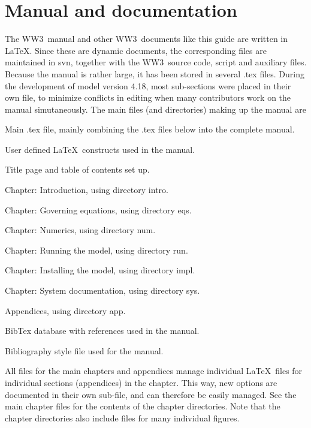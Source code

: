 \documentclass[12pt]{article}
\newcommand{\ws}{WW3}
\newcommand{\file}{\sf}
\newcommand{\pb}{\strut \vfill \pagebreak}
\newcommand{\newsec}{\setcounter{equation}{0}
                      \setcounter{myfigno}{0}
                      \setcounter{mytabno}{0}}
\newenvironment{flist}{\begin{list}{nofile ?}{\parsep 0mm
            \itemsep 0mm \leftmargin 35mm \labelwidth 25mm
            \rightmargin 10mm}}{\end{list}}
\newcommand{\fit}[2]{\item[{\file{#1}}\hfill]{#2}}
\newcounter{myfigno}[section]
\newcounter{mytabno}[section]
\begin{document}
\clearpage

\section{Manual and documentation} \label{sec:man}
\newsec

The \ws\ manual and other \ws\ documents like this guide are written in
\LaTeX. Since these are dynamic documents, the corresponding files are
maintained in svn, together with the \ws\ source code, script and auxiliary
files. Because the manual is rather large, it has been stored in several
{\file .tex} files. During the development of model version 4.18, most
sub-sections were placed in their own file, to minimize conflicts in editing
when many contributors work on the manual simutaneously.  The main files (and
directories) making up the manual are

\begin{flist}
\fit{manual.tex}{Main {\file .tex} file, mainly combining the {\file .tex}
                 files below into the complete manual.}
\fit{defs.tex  }{User defined \LaTeX\ constructs used in the manual.}
\fit{start.tex }{Title page and table of contents set up.}
\fit{intro.tex }{Chapter: Introduction, using directory {\file intro}.}
\fit{eqs.tex   }{Chapter: Governing equations, using directory {\file eqs}.}
\fit{num.tex   }{Chapter: Numerics, using directory {\file num}.}
\fit{run.tex   }{Chapter: Running the model, using directory {\file run}.}
\fit{impl.tex  }{Chapter: Installing the model, using directory {\file impl}.}
\fit{sys.tex   }{Chapter: System documentation, using directory {\file sys}.}
\fit{app.tex   }{Appendices, using directory {\file app}.}
\fit{manual.bib}{BibTex database with references used in the manual.}
\fit{jas.bst   }{Bibliography style file used for the manual.}
\end{flist}

\vspace{\baselineskip} \noindent All files for the main chapters and
appendices manage individual \LaTeX\ files for individual sections
(appendices) in the chapter. This way, new options are documented in their own
sub-file, and can therefore be easily managed. See the main chapter files for
the contents of the chapter directories. Note that the chapter directories
also include files for many individual figures.
\end{document}

